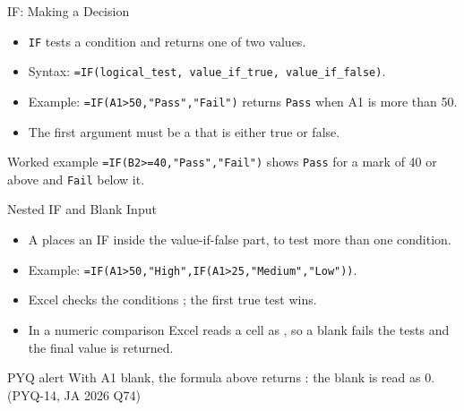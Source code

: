 \documentclass[aspectratio=169]{beamer}
\begin{document}
\begin{frame}{IF: Making a Decision}
  \begin{itemize}
    \item \texttt{IF} tests a condition and returns one of two values.
    \item Syntax: \texttt{=IF(logical\_test, value\_if\_true,
      value\_if\_false)}.
    \item Example: \texttt{=IF(A1>50,"Pass","Fail")} returns
      \texttt{Pass} when A1 is more than 50.
    \item The first argument must be a  that is either true
      or false.
  \end{itemize}
  \begin{exampleblock}{Worked example}
    \texttt{=IF(B2>=40,"Pass","Fail")} shows \texttt{Pass} for a mark of 40
    or above and \texttt{Fail} below it.
  \end{exampleblock}
\end{frame}

\begin{frame}{Nested IF and Blank Input}
  \begin{itemize}
    \item A  places an IF inside the value-if-false part, to
      test more than one condition.
    \item Example: \texttt{=IF(A1>50,"High",IF(A1>25,"Medium","Low"))}.
    \item Excel checks the conditions ; the first true test
      wins.
    \item In a numeric comparison Excel reads a  cell as
      , so a blank fails the tests and the final value is returned.
  \end{itemize}
  \begin{alertblock}{PYQ alert}
    With A1 blank, the formula above returns : the blank is read as
    0. (PYQ-14, JA 2026 Q74)
  \end{alertblock}
\end{frame}
\end{document}
